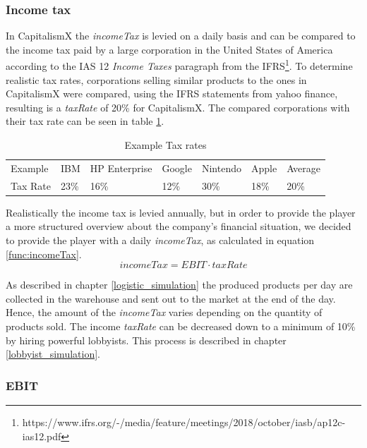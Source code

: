 \subsubsection{Income tax}
\label{sec:incomeTax}

In CapitalismX the \textit{incomeTax} is levied on a daily basis and can be compared to the income tax paid by a large corporation in the United States of America according to the IAS 12 \textit{Income Taxes} paragraph from the IFRS\footnote{https://www.ifrs.org/-/media/feature/meetings/2018/october/iasb/ap12c-ias12.pdf}. To determine realistic tax rates, corporations selling similar products to the ones in CapitalismX were compared, using the IFRS statements from yahoo finance, resulting is a \textit{taxRate} of 20\% for CapitalismX. The compared corporations with their tax rate can be seen in table \ref{Example_Tax}.

\begin{table}[!htbp]
\centering
\begin{tabular}{|l|l|l|l|l|l|l|}
\hline
Example & IBM & HP Enterprise & Google & Nintendo & Apple & Average \\
Tax Rate & 23\% & 16\% & 12\% & 30\% & 18\% & 20\% \\ \hline
\end{tabular}
\caption{Example Tax rates}
\label{Example_Tax}
\end{table}

Realistically the income tax is levied annually, but in order to provide the player a more structured overview about the company’s financial situation, we decided to provide the player with a daily \textit{incomeTax}, as calculated in equation \ref{func:incomeTax}. 
\begin{equation}
    \label{func:incomeTax}
    incomeTax = EBIT \cdot taxRate
\end{equation}

As described in chapter \ref{logistic_simulation} the produced products per day are collected in the warehouse and sent out to the market at the end of the day. Hence, the amount of the \textit{incomeTax} varies depending on the quantity of products sold. The income \textit{taxRate} can be decreased down to a minimum of 10\% by hiring powerful lobbyists. This process is described in chapter \ref{lobbyist_simulation}.

\subsubsection{EBIT}

